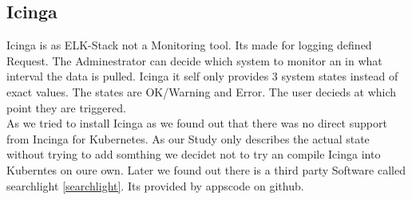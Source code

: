 \subsection{Icinga}
\label{Icinga}
Icinga is as ELK-Stack not a Monitoring tool. Its made for logging defined Request. The Adminestrator can decide which system to monitor an in what interval the data is pulled.
Icinga it self only provides 3 system states instead of exact values. The states are OK/Warning and Error. The user decieds at which point they are triggered.\\
As we tried to install Icinga as we found out that there was no direct support from Incinga for Kubernetes. As our Study only describes the actual state without trying to add somthing we decidet not to try an compile Icinga into Kuberntes on oure own. Later we found out there is a third party Software called searchlight \ref{searchlight}. Its provided by appscode on github.
 